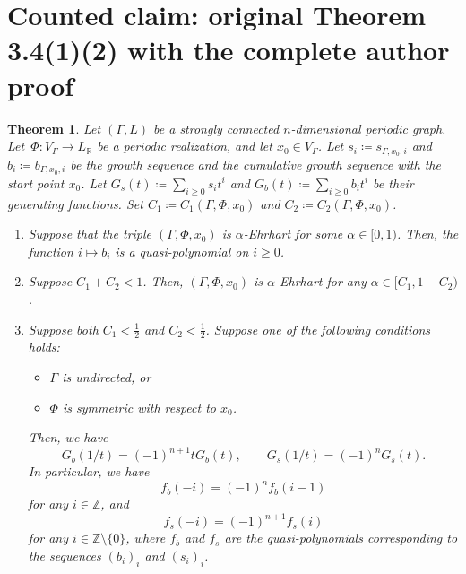 \documentclass[10pt,a4paper]{amsart}
\theoremstyle{plain}
\newtheorem{thm}[cdrthm]{Theorem}
\theoremstyle{definition}
\theoremstyle{remark}
\begin{document}
\section*{Counted claim: original Theorem 3.4(1)(2) with the complete author proof}
\begin{thm}\label{thm:ET}
Let $(\Gamma , L)$ be a strongly connected $n$-dimensional periodic graph. 
Let~$\Phi\colon V_{\Gamma} \to L_{\mathbb{R}}$ be a periodic realization, and let $x_0 \in V_{\Gamma}$. 
Let $s_i \coloneqq  s_{\Gamma, x_0, i}$ and $b_i \coloneqq  b_{\Gamma, x_0, i}$ be 
the growth sequence and the cumulative growth sequence with the start point $x_0$. 
Let $G_s(t) \coloneqq  \sum _{i \ge 0} s_i t^i$ and $G_b(t) \coloneqq  \sum _{i \ge 0} b_i t^i$ be their generating functions. 
Set $C_1 \coloneqq  C_{1}(\Gamma, \Phi, x_0)$ and $C_2 \coloneqq  C_{2}(\Gamma, \Phi, x_0)$. 
\begin{enumerate}
\item 
Suppose that the triple $(\Gamma, \Phi, x_0)$ is $\alpha$-Ehrhart for some $\alpha \in [0,1)$. 
Then, the function $i \mapsto b_i$ is a quasi-polynomial on $i \ge 0$. 

\item 
Suppose $C_1 + C_2 < 1$. 
Then, $(\Gamma, \Phi, x_0)$ is $\alpha$-Ehrhart for any $\alpha \in [C_{1}, 1-C_{2})$. 

\item 
Suppose both $C_1 < \frac{1}{2}$ and $C_2 < \frac{1}{2}$. 
Suppose one of the following conditions holds: 
\begin{itemize}
\item[(i)] $\Gamma$ is undirected, or

\item[(ii)] $\Phi$ is symmetric with respect to $x_0$. 
\end{itemize}
Then, we have 
\[
G_b(1/t) = (-1)^{n+1} t G_b(t), \qquad 
G_s(1/t) = (-1)^n G_s(t). 
\]
In particular, we have 
\[
f_b(-i) = (-1)^n f_b(i-1)
\]
for any $i \in \mathbb{Z}$, and 
\[
f_s(-i) = (-1)^{n+1} f_s(i)
\]
for any $i \in \mathbb{Z} \setminus \{ 0 \}$, 
where $f_b$ and $f_s$ are the quasi-polynomials corresponding to the sequences $(b_i)_i$ and $(s_i)_i$. 
\end{enumerate}
\end{thm}
\end{document}
